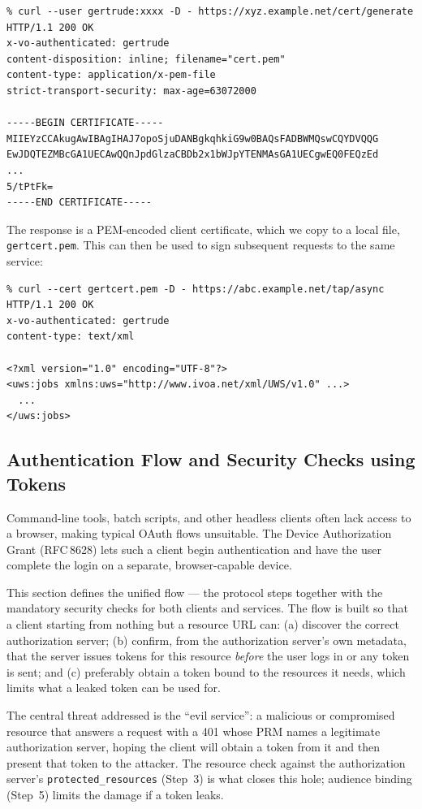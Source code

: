 \documentclass[11pt,a4paper]{ivoa}
\newcommand{\rfc}[1]{RFC\,#1}
\begin{document}
{\footnotesize
\begin{verbatim}
% curl --user gertrude:xxxx -D - https://xyz.example.net/cert/generate
HTTP/1.1 200 OK
x-vo-authenticated: gertrude
content-disposition: inline; filename="cert.pem"
content-type: application/x-pem-file
strict-transport-security: max-age=63072000

-----BEGIN CERTIFICATE-----
MIIEYzCCAkugAwIBAgIHAJ7opoSjuDANBgkqhkiG9w0BAQsFADBWMQswCQYDVQQG
EwJDQTEZMBcGA1UECAwQQnJpdGlzaCBDb2x1bWJpYTENMAsGA1UECgwEQ0FEQzEd
...
5/tPtFk=
-----END CERTIFICATE-----
\end{verbatim}
}

\noindent
The response is a PEM-encoded client certificate, which we copy
to a local file, \verb|gertcert.pem|.
This can then be used to sign subsequent requests to the same service:
{\footnotesize
\begin{verbatim}
% curl --cert gertcert.pem -D - https://abc.example.net/tap/async
HTTP/1.1 200 OK
x-vo-authenticated: gertrude
content-type: text/xml

<?xml version="1.0" encoding="UTF-8"?>
<uws:jobs xmlns:uws="http://www.ivoa.net/xml/UWS/v1.0" ...>
  ...
</uws:jobs>
\end{verbatim}
}
\subsection{Authentication Flow and Security Checks using Tokens}
\label{sec:ivoa-bearer-flow}

Command-line tools, batch scripts, and other headless clients often lack
access to a browser, making typical OAuth flows unsuitable. The Device
Authorization Grant (\rfc{8628}) lets such a client begin authentication and
have the user complete the login on a separate, browser-capable device.

This section defines the unified flow --- the protocol steps together with the
mandatory security checks for both clients and services. The flow is built so
that a client starting from nothing but a resource URL can: (a) discover the
correct authorization server; (b) confirm, from the authorization server's own
metadata, that the server issues tokens for this resource \emph{before} the
user logs in or any token is sent; and (c) preferably obtain a token bound to
the resources it needs, which limits what a leaked token can be used for.

The central threat addressed is the ``evil service'': a malicious or
compromised resource that answers a request with a 401 whose PRM names a
legitimate authorization server, hoping the client will obtain a token from it
and then present that token to the attacker. The resource check against the
authorization server's \verb|protected_resources| (Step~3) is what closes this
hole; audience binding (Step~5) limits the damage if a token leaks.
\end{document}
